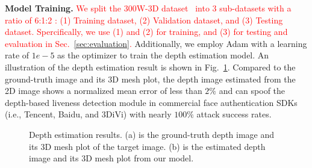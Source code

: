 \textbf{Model Training.}
\textcolor{red}{We split the 300W-3D dataset~\cite{zhu2016face} into 3 sub-datasets with a ratio of 6:1:2 : (1) Training dataset, (2) Validation dataset, and (3) Testing dataset. Spercifically, we use (1) and (2) for training, and (3) for testing and evaluation in Sec.~\ref{sec:evaluation}. } 
Additionally, we employ Adam with a learning rate of $1e{-}5$  as the optimizer to train the depth estimation model. An illustration of the depth estimation result is shown in Fig.~\ref{estimation_result}. Compared to the ground-truth image and its 3D mesh plot, the depth image estimated from the 2D image shows a normalized mean error of less than $2\%$ and can spoof the depth-based liveness detection module in commercial face authentication SDKs (i.e., Tencent, Baidu, and 3DiVi) with nearly $100\%$ attack success rates.




\begin{figure}[!t]
	\centering
	\vspace{-0.1in}
	\caption{Depth estimation results. (a) is the ground-truth depth image and its 3D mesh plot of the target image. (b) is the estimated depth image and its 3D mesh plot from our model.}
	\label{estimation_result}
\vspace{-0.15in}
\end{figure}

